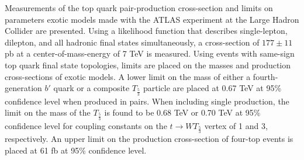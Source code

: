 %

Measurements of the top quark pair-production cross-section and limits on parameters exotic models made with the ATLAS experiment at the Large Hadron Collider are presented.
Using a likelihood function that describes single-lepton, dilepton, and all hadronic final states simultaneously, a cross-section of $177 \pm 11$ pb at a center-of-mass-energy of 7 TeV is measured.
Using events with same-sign top quark final state topologies, limits are placed on the masses and production cross-sections of exotic models.
A lower limit on the mass of either a fourth-generation $b'$ quark or a composite $T_{\frac{5}{3}}$ particle are placed at 0.67 TeV at 95\% confidence level when produced in pairs.
When including single production, the limit on the mass of the $T_{\frac{5}{3}}$ is found to be 0.68 TeV or 0.70 TeV at 95\% confidence level for coupling constants on the $t \rightarrow WT_{\frac{5}{3}}$ vertex of 1 and 3, respectively.
An upper limit on the production cross-section of four-top events is placed at 61 fb at 95\% confidence level.
